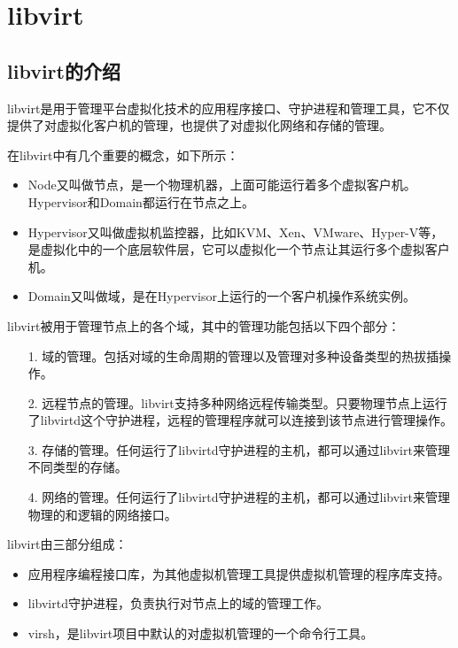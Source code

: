 \documentclass[a4paper,left=2.5cm,right=2.5cm,11pt]{article}
\begin{document}
\tableofcontents

\clearpage

\section{libvirt}
\subsection{libvirt的介绍}
	libvirt是用于管理平台虚拟化技术的应用程序接口、守护进程和管理工具，它不仅提供了对虚拟化客户机的管理，也提供了对虚拟化网络和存储的管理。\par
	在libvirt中有几个重要的概念，如下所示：
	\begin{itemize}
		\item Node又叫做节点，是一个物理机器，上面可能运行着多个虚拟客户机。Hypervisor和Domain都运行在节点之上。
		\item Hypervisor又叫做虚拟机监控器，比如KVM、Xen、VMware、Hyper-V等，是虚拟化中的一个底层软件层，它可以虚拟化一个节点让其运行多个虚拟客户机。
		\item Domain又叫做域，是在Hypervisor上运行的一个客户机操作系统实例。
	\end{itemize}

	libvirt被用于管理节点上的各个域，其中的管理功能包括以下四个部分：
	\begin{itemize}
		\item[1.] 域的管理。包括对域的生命周期的管理以及管理对多种设备类型的热拔插操作。
		\item[2.] 远程节点的管理。libvirt支持多种网络远程传输类型。只要物理节点上运行了libvirtd这个守护进程，远程的管理程序就可以连接到该节点进行管理操作。
		\item[3.] 存储的管理。任何运行了libvirtd守护进程的主机，都可以通过libvirt来管理不同类型的存储。
		\item[4.] 网络的管理。任何运行了libvirtd守护进程的主机，都可以通过libvirt来管理物理的和逻辑的网络接口。
	\end{itemize}

	libvirt由三部分组成：
	\begin{itemize}
		\item 应用程序编程接口库，为其他虚拟机管理工具提供虚拟机管理的程序库支持。
		\item libvirtd守护进程，负责执行对节点上的域的管理工作。
		\item virsh，是libvirt项目中默认的对虚拟机管理的一个命令行工具。
	\end{itemize}
\end{document}
